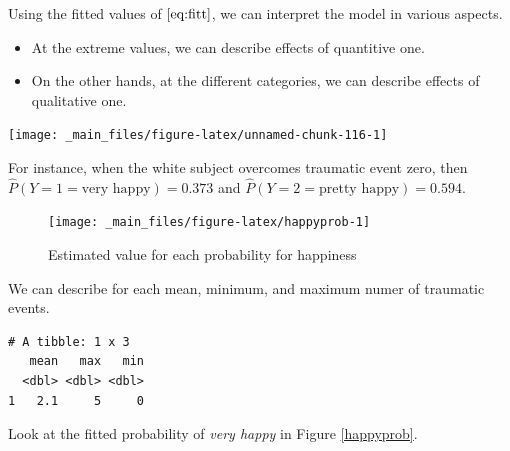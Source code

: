 \documentclass[]{book}
\newenvironment{Shaded}{\begin{snugshade}}{\end{snugshade}}
\newcommand{\DataTypeTok}[1]{\textcolor[rgb]{0.13,0.29,0.53}{#1}}
\newcommand{\KeywordTok}[1]{\textcolor[rgb]{0.13,0.29,0.53}{\textbf{#1}}}
\newcommand{\NormalTok}[1]{#1}
\newcommand{\OperatorTok}[1]{\textcolor[rgb]{0.81,0.36,0.00}{\textbf{#1}}}
\newcommand{\StringTok}[1]{\textcolor[rgb]{0.31,0.60,0.02}{#1}}
\providecommand{\tightlist}{%
  \setlength{\itemsep}{0pt}\setlength{\parskip}{0pt}}
\begin{document}
Using the fitted values of \(\eqref{eq:fitt}\), we can interpret the model in various aspects.

\begin{itemize}
\tightlist
\item
  At the extreme values, we can describe effects of quantitive one.
\item
  On the other hands, at the different categories, we can describe effects of qualitative one.
\end{itemize}

\begin{Shaded}
\end{Shaded}

\begin{center}\texttt{[image: \_main\_files/figure-latex/unnamed-chunk-116-1]} \end{center}

For instance, when the white subject overcomes traumatic event zero, then \(\hat{P}(Y = 1 = \text{very happy}) = 0.373\) and \(\hat{P}(Y = 2 = \text{pretty happy}) = 0.594\).

\begin{figure}[H]

{\centering \texttt{[image: \_main\_files/figure-latex/happyprob-1]} 

}

\caption{Estimated value for each probability for happiness\label{happyprob}}\label{fig:happyprob}
\end{figure}

We can describe for each mean, minimum, and maximum numer of traumatic events.

\begin{verbatim}
# A tibble: 1 x 3
   mean   max   min
  <dbl> <dbl> <dbl>
1   2.1     5     0
\end{verbatim}

Look at the fitted probability of \emph{very happy} in Figure \ref{happyprob}.
\end{document}
